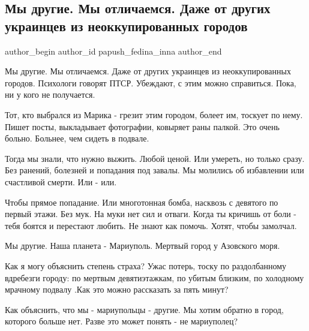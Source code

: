  
 
 
 
 
 
\subsection{Мы другие. Мы отличаемся. Даже от других украинцев из неоккупированных городов}
\label{sec:24_05_2022.fb.papush_fedina_inna.1.my_drugie}
 
\ifcmt
 author_begin
   author_id papush_fedina_inna
 author_end
\fi

Мы другие. Мы отличаемся. Даже от других украинцев из неоккупированных городов.
Психологи говорят ПТСР. Убеждают,  с этим можно справиться. Пока, ни у кого не
получается. 

Тот, кто выбрался из Марика - грезит этим городом, болеет им, тоскует по
нему. Пишет посты, выкладывает фотографии, ковыряет раны палкой. Это очень
больно. Больнее, чем сидеть в подвале. 


Тогда мы знали, что нужно выжить. Любой ценой. Или умереть, но только сразу.
Без ранений, болезней и попадания под завалы. Мы молились об избавлении или
счастливой смерти. Или - или. 

Чтобы прямое попадание. Или многотонная бомба, насквозь с девятого по первый
этажи.  Без мук. На муки нет сил и отваги. Когда ты кричишь от боли -  тебя
боятся и перестают любить. Не знают как помочь. Хотят, чтобы замолчал.

Мы другие. Наша планета -  Мариуполь. Мертвый город у Азовского моря.

Как я могу объяснить степень страха?  Ужас потерь, тоску по раздолбанному
вдребезги городу: по  мертвым девятиэтажкам, по убитым  близким, по холодному
мрачному подвалу .Как это можно рассказать за пять минут? 

Как объяснить, что мы - мариупольцы - другие. Мы хотим обратно в город,
которого больше нет. Разве это может понять - не мариуполец? 

